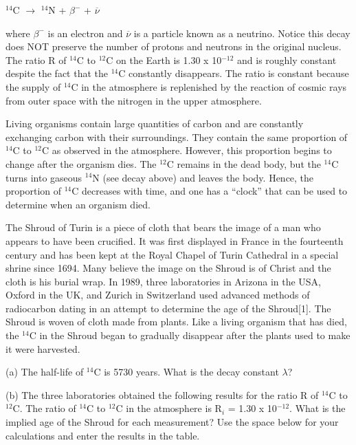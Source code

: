 {\centering \( ^{14} \)C \( \rightarrow  \) \( ^{14} \)N + \( \beta ^{-} \)
+ \( \overline{\nu } \)\par}

where \( \beta ^{-} \) is an electron and \( \overline{\nu } \)
is a particle known as a neutrino. Notice this decay does NOT preserve
the number of protons and neutrons in the original nucleus. The ratio
R of \( ^{14} \)C to \( ^{12} \)C on the Earth is 1.30 x 10\( ^{-12} \)
and is roughly constant despite the fact that the \( ^{14} \)C constantly
disappears. The ratio is constant because the supply of \( ^{14} \)C
in the atmosphere is replenished by the reaction of cosmic rays from
outer space with the nitrogen in the upper atmosphere.

Living organisms contain large quantities of carbon and are constantly
exchanging carbon with their surroundings. They contain the same proportion
of \( ^{14} \)C to \( ^{12} \)C as observed in the atmosphere. However,
this proportion begins to change after the organism dies. The \( ^{12} \)C
remains in the dead body, but the \( ^{14} \)C turns into gaseous
\( ^{14} \)N (see decay above) and leaves the body. Hence, the proportion
of \( ^{14} \)C decreases with time, and one has a {}``clock''
that can be used to determine when an organism died. 

The Shroud of Turin is a piece of cloth that bears the image of a
man who appears to have been crucified. It was first displayed in
France in the fourteenth century and has been kept at the Royal Chapel
of Turin Cathedral in a special shrine since 1694. Many believe the
image on the Shroud is of Christ and the cloth is his burial wrap.
In 1989, three laboratories in Arizona in the USA, Oxford in the UK,
and Zurich in Switzerland used advanced methods of radiocarbon dating
in an attempt to determine the age of the Shroud{[}1{]}. The Shroud
is woven of cloth made from plants. Like a living organism that has
died, the \( ^{14} \)C in the Shroud began to gradually disappear
after the plants used to make it were harvested.

(a) The half-life of \( ^{14} \)C is 5730 years. What is the decay
constant \( \lambda  \)?
\vspace{25mm}

\newpage

(b) The three laboratories obtained the following results for the
ratio R of \( ^{14} \)C to \( ^{12} \)C. The ratio of \( ^{14} \)C
to \( ^{12} \)C in the atmosphere is R\( _{i} \) = 1.30 x 10\( ^{-12} \).
What is the implied age of the Shroud for each measurement? Use the
space below for your calculations and enter the results in the table. 

